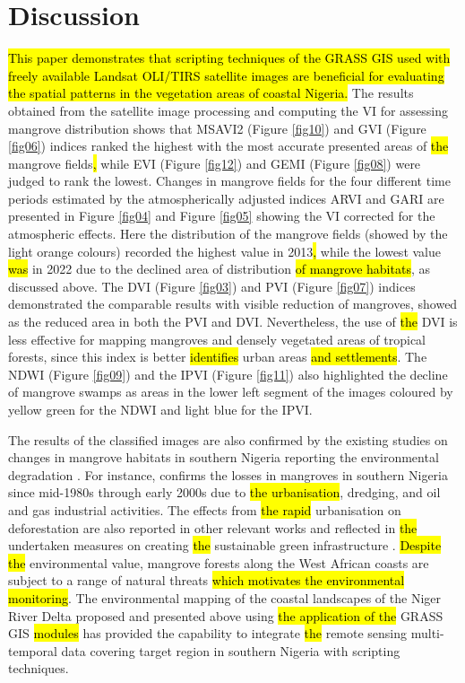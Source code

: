 \documentclass[jmse,article,submit,pdftex,moreauthors]{Definitions/mdpi}
\begin{document}
\section{Discussion}

\hl{This paper demonstrates that scripting techniques of the GRASS GIS used with freely available Landsat OLI/TIRS satellite images are beneficial for evaluating the spatial patterns in the vegetation areas of coastal Nigeria. }The results obtained from the satellite image processing and computing\hl{ }the VI for assessing mangrove distribution shows that MSAVI2 (Figure \ref{fig10}) and GVI (Figure \ref{fig06}) indices ranked the highest with the most accurate presented areas of \hl{the }mangrove fields\hl{, }while EVI (Figure \ref{fig12}) and GEMI (Figure \ref{fig08}) were judged to rank the lowest.\hl{ }Changes in mangrove fields for the four different time periods estimated by the atmospherically adjusted indices ARVI and GARI are presented in Figure \ref{fig04} and Figure \ref{fig05} showing the VI corrected for the atmospheric effects. Here the distribution of the mangrove fields (showed by the light orange colours) recorded the highest value in 2013\hl{, }while the lowest value \hl{was }in 2022 due to the declined area of distribution \hl{of mangrove habitats}, as discussed above. The DVI (Figure \ref{fig03}) and PVI (Figure \ref{fig07}) indices demonstrated the comparable results with visible reduction of mangroves, showed as the reduced area\hl{ }in both the PVI and DVI. Nevertheless, the use of \hl{the }DVI is less effective for mapping mangroves and densely vegetated areas of tropical forests, since this index is better \hl{identifies} urban areas \hl{and settlements}. The NDWI (Figure \ref{fig09}) and the IPVI (Figure \ref{fig11}) also highlighted the decline of mangrove swamps as areas in the lower left segment of the images coloured by yellow green for the NDWI and light blue for the IPVI.

The results of the classified images are also confirmed by the existing studies on changes in mangrove habitats in southern Nigeria reporting the environmental degradation \cite{BAMIDELE2023103274,TOBORE2022158}. For instance, \cite{Godstime2007} confirms the losses in mangroves in southern Nigeria since mid-1980s through early 2000s due to \hl{the urbanisation}, dredging, and oil and gas industrial activities. The effects from \hl{the rapid }urbanisation on deforestation are also reported in other relevant works \cite{AyanladeDrake,su141811289} and reflected in \hl{the }undertaken measures on creating \hl{the }sustainable green infrastructure \cite{ADEGUN2021e01044}. \hl{Despite the }environmental value, mangrove forests along the West African coasts are subject to a range of natural threats \hl{which motivates the environmental monitoring}. The environmental mapping of the coastal landscapes of the Niger River Delta proposed and presented above using \hl{the application of the }GRASS GIS \hl{modules }has provided the capability to integrate \hl{the }remote sensing multi-temporal data covering target region in southern Nigeria\hl{ }with scripting techniques. 
\end{document}
